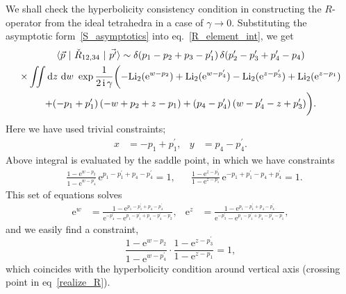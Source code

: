 \documentclass[12pt]{article}
\numberwithin{equation}{section}
\newcommand{\Li}{\mathrm{Li}_2}
\begin{document}
We shall check the hyperbolicity consistency  condition in constructing
the  $R$-operator from
the ideal tetrahedra in a case of $\gamma \to 0$.
Substituting the asymptotic form~\eqref{S_asymptotics}
into
eq.~\eqref{R_element_int},
we get
\begin{multline}
  \langle \vec{p} \ | \  \Check{R}_{12,34} \  | \ \vec{p^\prime} \rangle
  \sim
  \delta(p_1 - p_2 + p_3 - p_1^\prime) \,
  \delta(p_2^\prime -p_3^\prime + p_4^\prime - p_4) \\
  \times
  \iint \mathrm{d} z \ \mathrm{d} w \
  \exp
  \frac{1}{ 2 \, \mathrm{i} \, \gamma}
  \biggl(
  - \Li(\mathrm{e}^{w-p_2}) + \Li(\mathrm{e}^{w-p_4^\prime})
  - \Li(\mathrm{e}^{z-p_3^\prime})
  + \Li(\mathrm{e}^{z-p_1})
  \\
  + (-p_1 + p_1^\prime) \, (-w+p_2 + z - p_1)
  + (p_4 - p_4^\prime) \, ( w - p_4^\prime - z + p_3^\prime)
  \biggr) .
\end{multline}
Here we have used  trivial  constraints;
\begin{align}
  \label{constraint_x_y}
  x & = -p_1 + p_1^\prime  ,
  &
  y &=  p_4 - p_4^\prime .
\end{align}
Above  integral is  evaluated by the saddle point,
in which
we have constraints
  \begin{align*}
    & \frac{1- \mathrm{e}^{w-p_2}}{1-\mathrm{e}^{w-p_4^\prime}}
    \,
    \mathrm{e}^{p_1 - p_1^\prime + p_4 - p_4^\prime}
    = 1 ,
    &
%
    &
    \frac{1- \mathrm{e}^{z-p_3^\prime}}{1-\mathrm{e}^{z-p_1}}
    \,
    \mathrm{e}^{-p_1 + p_1^\prime - p_4 + p_4^\prime}
    = 1  .
  \end{align*}
This set of equations solves
\begin{align}
  \label{obtain_w_z}
  \mathrm{e}^w
  &=
  \frac{1- \mathrm{e}^{p_1 - p_1^\prime + p_4 - p_4^\prime}}
  {
    \mathrm{e}^{-p_4^\prime}
    -
    \mathrm{e}^{p_1 - p_1^\prime + p_4 - p_4^\prime - p_2}
    } ,
  &
%
  \mathrm{e}^z
  &=
  \frac{1- \mathrm{e}^{p_1 - p_1^\prime + p_4 - p_4^\prime}}
  {
    \mathrm{e}^{-p_3^\prime}
    -
    \mathrm{e}^{p_1 - p_1^\prime + p_4 - p_4^\prime - p_1}
    } ,
\end{align}
and we easily find a constraint,
\begin{equation}
  \label{constraint_w_z}
  \frac{1- \mathrm{e}^{w-p_2}}{1-\mathrm{e}^{w-p_4^\prime}} \cdot
  \frac{1- \mathrm{e}^{z-p_3^\prime}}{1-\mathrm{e}^{z-p_1}}
  = 1 ,
\end{equation}
which
coincides with  the hyperbolicity condition around vertical axis
(crossing point in eq~\eqref{realize_R}).
\end{document}

